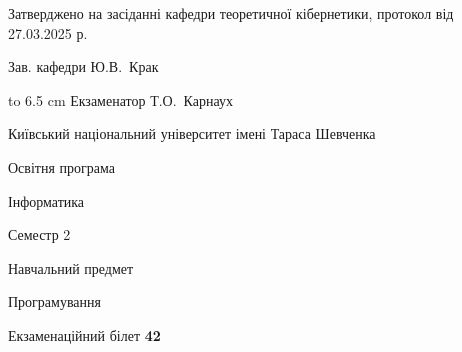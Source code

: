 \documentclass[12pt, ukrainian]{article}
\begin{document}
{\smallskip\smallskip \begin {scriptsize} Затверджено на засіданні кафедри теоретичної кібернетики, протокол   від   27.03.2025 р.\par\smallskip\smallskip\smallskip\smallskip
{\parbox {6.5 cm} {Зав. кафедри \dotfill Ю.В.~Крак}}\hspace {0.7cm} {\hbox to 6.5 cm { Екзаменатор \dotfill Т.О.~Карнаух}} \end{scriptsize}}
\newpage
{{\begin {scriptsize}\par
{ \center  Київський національний університет імені Тараса Шевченка \par}
{\parbox {5 cm}{Освітня програма \hfill}{\parbox {7 cm}{Інформатика\hfill}}\parbox {6 cm}{\hfill Семестр 2}}\par
{\parbox {5 cm} {Навчальний предмет \hfill}\parbox {7 cm}{Програмування \hfill}\parbox {6cm}{\hfill}\par}\vspace{-15pt} \end{scriptsize}}{\center Екзаменаційний білет \No \textbf { 42 }\par}}
\end{document}
